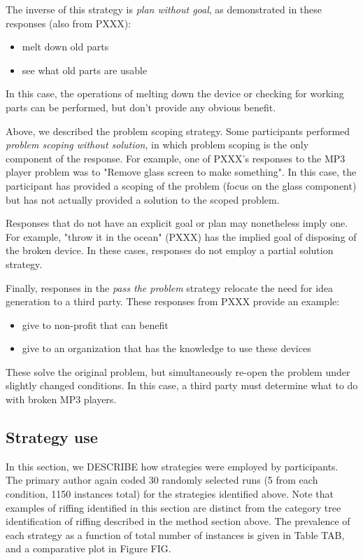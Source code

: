 The inverse of this strategy is \emph{plan without goal}, as demonstrated in these responses (also from PXXX):
\begin{itemize}
    \item melt down old parts
    \item see what old parts are usable
\end{itemize}
In this case, the operations of melting down the device or checking for working parts can be performed, but don't provide any obvious benefit.

Above, we described the problem scoping strategy. Some participants performed \emph{problem scoping without solution}, in which problem scoping is the only component of the response.
For example, one of PXXX's responses to the MP3 player problem was to "Remove glass screen to make something". In this case, the participant has provided a scoping of the problem (focus on the glass component) but has not actually provided a solution to the scoped problem.

Responses that do not have an explicit goal or plan may nonetheless imply one. For example, "throw it in the ocean" (PXXX) has the implied goal of disposing of the broken device. In these cases, responses do not employ a partial solution strategy.

Finally, responses in the \emph{pass the problem} strategy relocate the need for idea generation to a third party. These responses from PXXX provide an example:

\begin{itemize}
    \item give to non-profit that can benefit
    \item give to an organization that has the knowledge to use these devices
\end{itemize}

These solve the original problem, but simultaneously re-open the problem under slightly changed conditions. In this case, a third party must determine what to do with broken MP3 players.

\subsection{Strategy use}

In this section, we DESCRIBE how strategies were employed by participants. The primary author again coded 30 randomly selected runs (5 from each condition, 1150 instances total) for the strategies identified above. Note that examples of riffing identified in this section are distinct from the category tree identification of riffing described in the method section above. The prevalence of each strategy as a function of total number of instances is given in Table TAB, and a comparative plot in Figure FIG.

